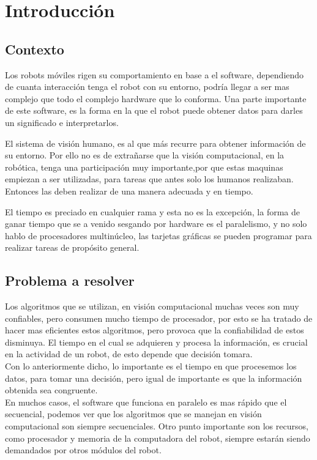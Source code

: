 \chapter{Introducción}

\section{Contexto}
Los robots móviles rigen su comportamiento en base a el software, dependiendo de cuanta interacción tenga el robot con su entorno, podría llegar a ser mas complejo que todo el complejo hardware que lo conforma. Una parte importante de este software, es la forma en la que el robot puede obtener datos para darles un significado e interpretarlos. 

El sistema de visión humano, es al que más recurre para obtener información de su entorno. Por ello no es de extrañarse que la visión computacional, en la robótica, tenga una participación muy importante,por que estas maquinas empiezan a ser utilizadas, para tareas que antes solo los humanos realizaban. Entonces las deben realizar de una manera adecuada y en tiempo. 

El tiempo es preciado en cualquier rama y esta no es la excepción, la forma de ganar tiempo que se a venido sesgando por hardware es el paralelismo, y no solo hablo de procesadores multinúcleo, las tarjetas gráficas se pueden programar para realizar tareas de propósito general.   

\pagebreak

\section{Problema a resolver}
Los algoritmos que se utilizan, en visión computacional muchas veces son muy confiables, pero consumen mucho tiempo de procesador, por esto se ha tratado de hacer mas eficientes estos algoritmos, pero provoca que  la confiabilidad de estos disminuya. El tiempo en el cual se adquieren y procesa la información, es crucial en la actividad de un robot, de esto depende que decisión tomara.\\

Con lo anteriormente dicho, lo importante es el tiempo en que procesemos los datos, para tomar una decisión, pero igual de importante es que la información obtenida sea congruente. \\

En muchos casos, el software que funciona en paralelo es mas rápido que el secuencial, podemos ver que los algoritmos que se manejan en visión computacional son siempre secuenciales. Otro punto importante son los recursos, como procesador y memoria de la computadora del robot, siempre estarán siendo demandados por otros módulos del robot.    \\

